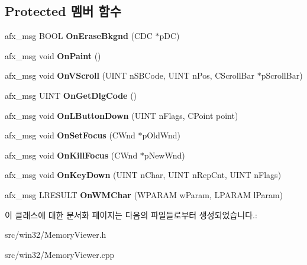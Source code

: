 \subsection*{Protected 멤버 함수}
\begin{DoxyCompactItemize}
\item 
\mbox{\label{class_memory_viewer_a4526960fde4490046ce584462eb26dcb}} 
afx\+\_\+msg B\+O\+OL {\bfseries On\+Erase\+Bkgnd} (C\+DC $\ast$p\+DC)
\item 
\mbox{\label{class_memory_viewer_a83e2e0a597c7c25d7fc496411ec1d46f}} 
afx\+\_\+msg void {\bfseries On\+Paint} ()
\item 
\mbox{\label{class_memory_viewer_ab371c01b5cc7069561f448e46e7d44a4}} 
afx\+\_\+msg void {\bfseries On\+V\+Scroll} (U\+I\+NT n\+S\+B\+Code, U\+I\+NT n\+Pos, C\+Scroll\+Bar $\ast$p\+Scroll\+Bar)
\item 
\mbox{\label{class_memory_viewer_ab33125683b4ca8997d8dda88835512ff}} 
afx\+\_\+msg U\+I\+NT {\bfseries On\+Get\+Dlg\+Code} ()
\item 
\mbox{\label{class_memory_viewer_aa17edb0fbc507fe79493ec235cd124f2}} 
afx\+\_\+msg void {\bfseries On\+L\+Button\+Down} (U\+I\+NT n\+Flags, C\+Point point)
\item 
\mbox{\label{class_memory_viewer_a8a245f3c99b525dded9e776a4a5976de}} 
afx\+\_\+msg void {\bfseries On\+Set\+Focus} (C\+Wnd $\ast$p\+Old\+Wnd)
\item 
\mbox{\label{class_memory_viewer_af513c221df2a84b02c4172213cdbeec1}} 
afx\+\_\+msg void {\bfseries On\+Kill\+Focus} (C\+Wnd $\ast$p\+New\+Wnd)
\item 
\mbox{\label{class_memory_viewer_afc4781b16d21212f67e5dd299c537718}} 
afx\+\_\+msg void {\bfseries On\+Key\+Down} (U\+I\+NT n\+Char, U\+I\+NT n\+Rep\+Cnt, U\+I\+NT n\+Flags)
\item 
\mbox{\label{class_memory_viewer_a47fb6730b742faedeafbb622e008317e}} 
afx\+\_\+msg L\+R\+E\+S\+U\+LT {\bfseries On\+W\+M\+Char} (W\+P\+A\+R\+AM w\+Param, L\+P\+A\+R\+AM l\+Param)
\end{DoxyCompactItemize}


이 클래스에 대한 문서화 페이지는 다음의 파일들로부터 생성되었습니다.\+:\begin{DoxyCompactItemize}
\item 
src/win32/Memory\+Viewer.\+h\item 
src/win32/Memory\+Viewer.\+cpp\end{DoxyCompactItemize}
